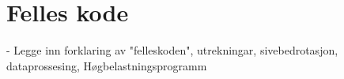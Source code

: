 \section{Felles kode}
\thispagestyle{fancy}


- Legge inn forklaring av "felleskoden", utrekningar, sivebedrotasjon, dataprossesing, Høgbelastningsprogramm